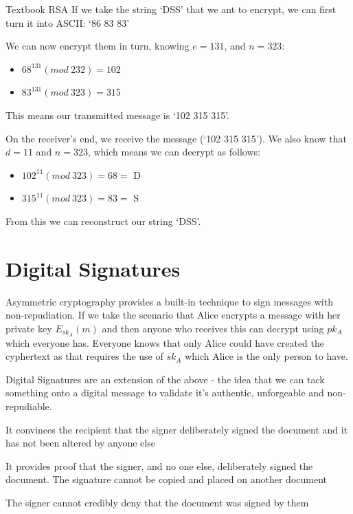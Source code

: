 \begin{example}{Textbook RSA}
If we take the string `DSS' that we ant to encrypt, we can first turn it into ASCII: `86 83 83'

We can now encrypt them in turn, knowing $e=131$, and $n=323$:
\begin{itemize}
    \item $68^{131} (mod\ 232) = 102$
    \item $83^{131} (mod\ 323) = 315$
\end{itemize}

This means our transmitted message is `102 315 315'.

On the receiver's end, we receive the message (`102 315 315'). We also know that $d=11$ and $n=323$, which means we can decrypt as follows:
\begin{itemize}
    \item $102^{11} (mod\ 323) = 68 =$ D
    \item $315^{11} (mod\ 323) = 83 =$ S
\end{itemize}

From this we can reconstruct our string `DSS'. 
\end{example}

\section{Digital Signatures}
Asymmetric cryptography provides a built-in technique to sign messages with non-repudiation. If we take the scenario that Alice encrypts a message with her private key $E_{sk_{A}}(m)$ and then anyone who receives this can decrypt using $pk_A$ which everyone has. Everyone knows that only Alice could have created the cyphertext as that requires the use of $sk_A$ which Alice is the only person to have.

Digital Signatures are an extension of the above - the idea that we can tack something onto a digital message to validate it's authentic, unforgeable and non-repudiable.

\begin{define}
\item[Authentic] It convinces the recipient that the signer deliberately signed the document and it has not been altered by anyone else
\item[Unforgeable] It provides proof that the signer, and no one else, deliberately signed the document. The signature cannot be copied and placed on another document
\item[Non-repudiable] The signer cannot credibly deny that the document was signed by them
\end{define}

